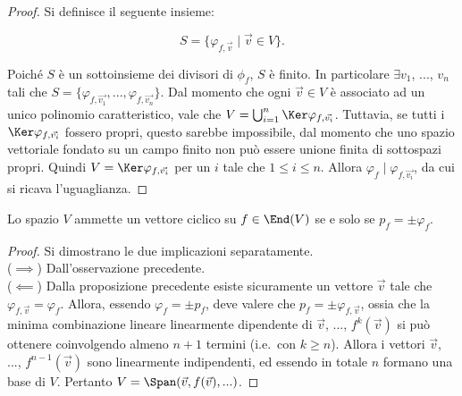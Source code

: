 \documentclass[11pt]{article}
\begin{document}
\begin{proof}
Si definisce il seguente insieme:

\[ S = \{ \varphi_{f, \vec{v}} \mid \vec{v} \in V \}. \]

\vskip 0.1in

Poiché $S$ è un sottoinsieme dei divisori di $\phi_f$, $S$ è finito.
In particolare $\exists v_1$, ..., $v_n$ tali che $S = \{ \varphi_{f, \vec{v_1}}, ..., \varphi_{f, \vec{v_n}} \}$. Dal momento
che ogni $\vec{v} \in V$ è associato
ad un unico polinomio caratteristico,
vale che $V = \bigcup_{i=1}^n \Ker \varphi_{f, \vec{v_i}}$. Tuttavia, se
tutti i $\Ker \varphi_{f, \vec{v_i}}$
fossero propri, questo sarebbe
impossibile, dal momento che uno spazio vettoriale fondato su un campo finito non può essere unione finita di sottospazi propri. Quindi $V = \Ker \varphi_{f, \vec{v_i}}$ per un $i$ tale che $1 \leq i \leq n$. Allora
$\varphi_f \mid \varphi_{f, \vec{v_i}}$, da cui si ricava
l'uguaglianza.
\end{proof}

\begin{theorem}
Lo spazio $V$ ammette un vettore ciclico su $f \in \End(V)$ se e
solo se $p_f = \pm \varphi_f$.
\end{theorem}

\begin{proof} Si dimostrano le due implicazioni separatamente. \\

($\implies$) Dall'osservazione precedente. \\
($\impliedby$) Dalla proposizione precedente esiste sicuramente
un vettore $\Vec{v}$ tale che $\varphi_{f,\Vec{v}} = \varphi_f$. Allora, essendo $\varphi_f = \pm p_f$, deve valere
che $p_f = \pm \varphi_{f, \Vec{v}}$, ossia che la minima
combinazione lineare linearmente dipendente di $\Vec{v}$, ..., $f^k(\Vec{v})$ si può ottenere coinvolgendo almeno $n+1$
termini (i.e.~con $k\geq n$). Allora i vettori
$\Vec{v}$, ...,
$f^{n-1}(\Vec{v})$ sono linearmente indipendenti, ed essendo
in totale $n$ formano una base di $V$. Pertanto $V = \Span(\Vec{v}, f(\Vec{v}), ...)$.
\end{proof}
\end{document}
